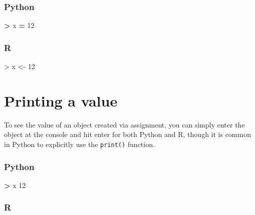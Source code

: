 \documentclass[
]{book}
\newenvironment{Shaded}{\begin{snugshade}}{\end{snugshade}}
\newcommand{\DecValTok}[1]{\textcolor[rgb]{0.00,0.00,0.81}{#1}}
\newcommand{\NormalTok}[1]{#1}
\newcommand{\OperatorTok}[1]{\textcolor[rgb]{0.81,0.36,0.00}{\textbf{#1}}}
\newcommand{\OtherTok}[1]{\textcolor[rgb]{0.56,0.35,0.01}{#1}}
\newcommand{\SpecialCharTok}[1]{\textcolor[rgb]{0.00,0.00,0.00}{#1}}
\begin{document}
\hypertarget{python-1}{%
\subsubsection*{Python}\label{python-1}}

\begin{Shaded}
\begin{Highlighting}[]
\OperatorTok{\textgreater{}}\NormalTok{ x }\OperatorTok{=} \DecValTok{12}
\end{Highlighting}
\end{Shaded}

\hypertarget{r-1}{%
\subsubsection*{R}\label{r-1}}

\begin{Shaded}
\begin{Highlighting}[]
\SpecialCharTok{\textgreater{}}\NormalTok{ x }\OtherTok{\textless{}{-}} \DecValTok{12}
\end{Highlighting}
\end{Shaded}

\hypertarget{printing-a-value}{%
\section{Printing a value}\label{printing-a-value}}

To see the value of an object created via assignment, you can simply enter the object at the console and hit enter for both Python and R, though it is common in Python to explicitly use the \texttt{print()} function.

\hypertarget{python-2}{%
\subsubsection*{Python}\label{python-2}}

\begin{Shaded}
\begin{Highlighting}[]
\OperatorTok{\textgreater{}}\NormalTok{ x}
\DecValTok{12}
\end{Highlighting}
\end{Shaded}

\hypertarget{r-2}{%
\subsubsection*{R}\label{r-2}}
\end{document}
